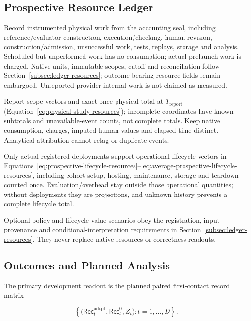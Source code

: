 \documentclass[10pt]{article} %
\providecommand{\1}{\mathbf{1}}  %
\theoremstyle{remark}
\theoremstyle{definition}
\begin{document}
\subsection{Prospective Resource Ledger}

\label{subsec:pilot-resource-ledger}

Record instrumented physical work from the accounting seal, including
reference/evaluator construction, execution/checking, human revision,
construction/admission, unsuccessful work, tests, replays, storage and
analysis. Scheduled but unperformed work has no consumption; actual
prelaunch work is charged. Native units, immutable scopes, cutoff and
reconciliation follow Section~\ref{subsec:ledger-resources}; outcome-bearing
resource fields remain embargoed. Unreported provider-internal work is not
claimed as measured.

Report scope vectors and exact-once physical total at $T_{\mathrm{report}}$
(Equation~\ref{eq:physical-study-resources}); incomplete coordinates have
known subtotals and unavailable-event counts, not complete totals. Keep
native consumption, charges, imputed human values and elapsed time distinct.
Analytical attribution cannot retag or duplicate events.

Only actual registered deployments support operational lifecycle vectors
in Equations~\ref{eq:prospective-lifecycle-resources}--\ref{eq:average-prospective-lifecycle-resources},
including cohort setup, hosting, maintenance, storage and teardown counted
once. Evaluation/overhead stay outside those operational quantities; without
deployments they are projections, and unknown history prevents a complete
lifecycle total.

Optional policy and lifecycle-value scenarios obey the registration,
input-provenance and conditional-interpretation requirements in
Section~\ref{subsec:ledger-resources}. They never replace native resources
or correctness readouts.

\subsection{Outcomes and Planned Analysis}

\label{subsec:pilot-outcomes}

The primary development readout is the planned paired first-contact record matrix

\begin{equation}
\left\{
\bigl(
\mathsf{Rec}_t^{\mathrm{adapt}},
\mathsf{Rec}_t^0,
Z_t
\bigr)
:
 t=1,\ldots,D
\right\}.
\label{eq:pilot-first-contact-matrix}
\end{equation}
\end{document}

